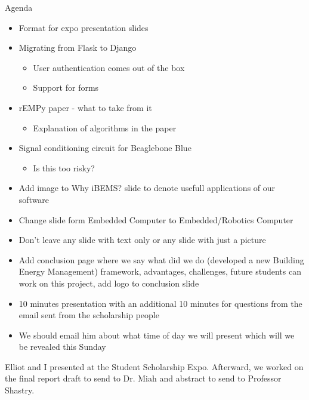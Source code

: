 \documentclass[fontsize=11pt, %
                             paper=letter, %
                             openany, %
                             captions=tableheading,
                             index=totoc,
                             hyperref]{labbook}
\begin{document}
Agenda
\begin{itemize}
\item Format for expo presentation slides
\item Migrating from Flask to Django
\begin{itemize}
\item User authentication comes out of the box
\item Support for forms
\end{itemize}
\item rEMPy paper - what to take from it
\begin{itemize}
\item Explanation of algorithms in the paper
\end{itemize}
\item Signal conditioning circuit for Beaglebone Blue
\begin{itemize}
\item Is this too risky?
\end{itemize}
\end{itemize}

\begin{itemize}
\item Add image to Why iBEMS? slide to denote usefull applications of our software
\item Change slide form Embedded Computer to Embedded/Robotics Computer
\item Don't leave any slide with text only or any slide with just a picture
\item Add conclusion page where we say what did we do (developed a new Building Energy Management) framework, advantages, challenges, future students can work on this project, add logo to conclusion slide
\item 10 minutes presentation with an additional 10 minutes for questions from the email sent from the scholarship people
\item We should email him about what time of day we will present which will we be revealed this Sunday
\end{itemize}

Elliot and I presented at the Student Scholarship Expo. Afterward, we worked on the final report draft to send to Dr. Miah and abstract to send to Professor Shastry.
\end{document}
